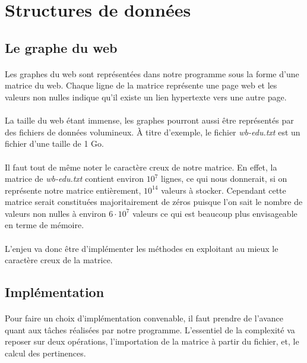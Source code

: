 \section{Structures de données}

	\subsection{Le graphe du web}
		
		\paragraph{}Les graphes du web sont représentées dans notre programme sous la forme d'une matrice du web. Chaque ligne de la matrice représente une page web et les valeurs non nulles indique qu'il existe un lien hypertexte vers une autre page.
		\paragraph{}La taille du web étant immense, les graphes pourront aussi être représentés par des fichiers de données volumineux. À titre d'exemple, le fichier \textit{wb-edu.txt} est un fichier d'une taille de 1 Go.
		\paragraph{}Il faut tout de même noter le caractère creux de notre matrice. En effet, la matrice de \textit{wb-edu.txt} contient environ $10^{7}$ lignes, ce qui nous donnerait, si on représente notre matrice entièrement, $10^{14}$ valeurs à stocker. Cependant cette matrice serait constituées majoritairement de zéros puisque l'on sait le nombre de valeurs non nulles à environ $6 \cdot 10^{7}$ valeurs ce qui est beaucoup plus envisageable en terme de mémoire.
		\paragraph{}L'enjeu va donc être d'implémenter les méthodes en exploitant au mieux le caractère creux de la matrice.
		
	\subsection{Implémentation}

		\paragraph{}Pour faire un choix d'implémentation convenable, il faut prendre de l'avance quant aux tâches réalisées par notre programme. L'essentiel de la complexité va reposer sur deux opérations, l'importation de la matrice à partir du fichier, et, le calcul des pertinences.
